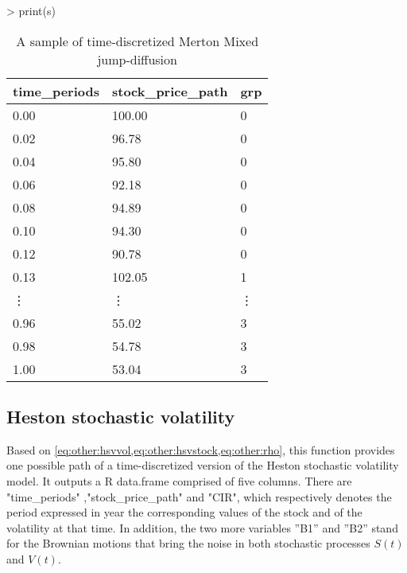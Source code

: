 \documentclass[12pt]{report}
\begin{document}
\begin{appendices}
\begin{Schunk}
\begin{Sinput}
> print(s)
\end{Sinput}
\end{Schunk}

\begin{table}[ht]
\centering
\begin{tabular}{lll}
  \hline
 time\_periods & stock\_price\_path &  grp \\ 
  \hline
   0.00 &100.00 &  0 \\ 
   0.02 &96.78  &  0 \\ 
   0.04 &95.80  &  0 \\ 
   0.06 &92.18  &  0 \\ 
   0.08 &94.89  &  0 \\ 
   0.10 &94.30  &  0 \\ 
   0.12 &90.78  &  0 \\ 
   0.13 &102.05 &  1 \\ 
 \vdots & \vdots & \vdots \\
 0.96 &55.02  &  3 \\ 
 0.98 &54.78  &  3 \\ 
 1.00 &53.04  &  3 \\ 
   \hline
\end{tabular}
\caption{A sample of time-discretized Merton Mixed jump-diffusion}
\end{table}





\subsection{Heston stochastic volatility}
\label{sub:r:time:heston}

Based on \cref{eq:other:hsvvol,eq:other:hsvstock,eq:other:rho}, this function provides one possible path of a time-discretized version of the Heston stochastic volatility model.
It outputs a R data.frame comprised of five columns. 
There are "time\_periods" ,"stock\_price\_path" and "CIR", which respectively denotes the period expressed in year the corresponding values of the stock and of the volatility at that time.
In addition, the two more variables ”B1” and ”B2” stand for the Brownian motions that bring the noise in both stochastic processes $S(t)$ and $V(t)$.


\end{appendices}
\end{document}
